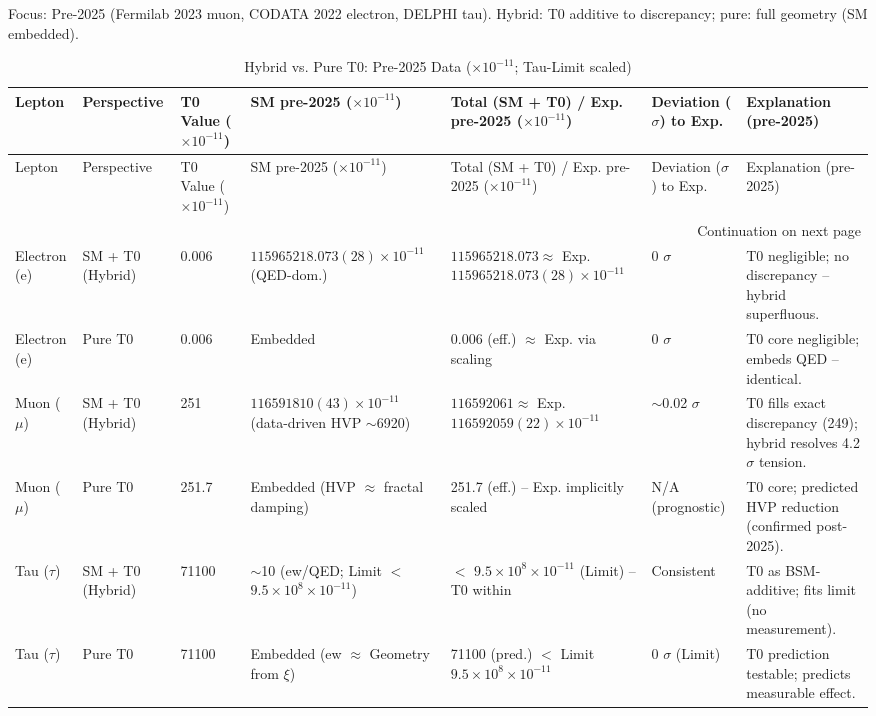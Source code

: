 \documentclass[12pt,a4paper]{article}
\begin{document}
	Focus: Pre-2025 (Fermilab 2023 muon, CODATA 2022 electron, DELPHI tau). Hybrid: T0 additive to discrepancy; pure: full geometry (SM embedded).
	
	\begin{longtable}{p{1.3cm}p{2cm}p{1cm}p{3.5cm}p{3cm}p{1.8cm}p{2.8cm}}
		\caption{Hybrid vs. Pure T0: Pre-2025 Data ($ \times 10^{-11}$; Tau-Limit scaled)} \label{tab:hybrid_pure}\\
		\toprule
		Lepton & Perspective & T0 Value ($ \times 10^{-11}$) & SM pre-2025 ($ \times 10^{-11}$) & Total (SM + T0) / Exp. pre-2025 ($ \times 10^{-11}$) & Deviation ($\sigma$) to Exp. & Explanation (pre-2025) \\
		\midrule
		\endfirsthead
		
		\toprule
		Lepton & Perspective & T0 Value ($ \times 10^{-11}$) & SM pre-2025 ($ \times 10^{-11}$) & Total (SM + T0) / Exp. pre-2025 ($ \times 10^{-11}$) & Deviation ($\sigma$) to Exp. & Explanation (pre-2025) \\
		\midrule
		\endhead
		
		\bottomrule
		\multicolumn{7}{r}{Continuation on next page} \\
		\endfoot
		
		Electron (e) & SM + T0 (Hybrid) & 0.006 & $115965218.073(28) \times 10^{-11}$ (QED-dom.) & $115965218.073 \approx$ Exp. $115965218.073(28) \times 10^{-11}$ & 0 $\sigma$ & T0 negligible; no discrepancy -- hybrid superfluous. \\
		Electron (e) & Pure T0 & 0.006 & Embedded & 0.006 (eff.) $\approx$ Exp. via scaling & 0 $\sigma$ & T0 core negligible; embeds QED -- identical. \\
		Muon ($\mu$) & SM + T0 (Hybrid) & 251 & $116591810(43) \times 10^{-11}$ (data-driven HVP $\sim$6920) & $116592061 \approx$ Exp. $116592059(22) \times 10^{-11}$ & $\sim$0.02 $\sigma$ & T0 fills exact discrepancy (249); hybrid resolves 4.2$\sigma$ tension. \\
		Muon ($\mu$) & Pure T0 & 251.7 & Embedded (HVP $\approx$ fractal damping) & 251.7 (eff.) -- Exp. implicitly scaled & N/A (prognostic) & T0 core; predicted HVP reduction (confirmed post-2025). \\
		Tau ($\tau$) & SM + T0 (Hybrid) & 71100 & $\sim$10 (ew/QED; Limit $<$ $9.5\times10^{8} \times 10^{-11}$) & $<$ $9.5\times10^{8} \times 10^{-11}$ (Limit) -- T0 within & Consistent & T0 as BSM-additive; fits limit (no measurement). \\
		Tau ($\tau$) & Pure T0 & 71100 & Embedded (ew $\approx$ Geometry from $\xi$) & 71100 (pred.) $<$ Limit $9.5\times10^{8} \times 10^{-11}$ & 0 $\sigma$ (Limit) & T0 prediction testable; predicts measurable effect. \\
	\end{longtable}
	
\end{document}

